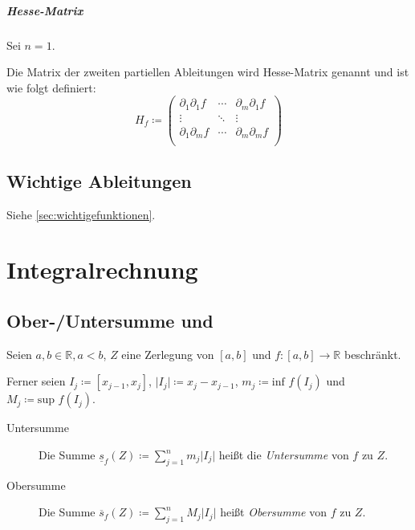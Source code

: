 	\paragraph{Hesse-Matrix}
		Sei $ n = 1 $.

		Die Matrix der zweiten partiellen Ableitungen wird Hesse-Matrix genannt und ist wie folgt definiert:
		\begin{equation*}
			H _ f \coloneqq
			\begin{pmatrix}
				\partial _ 1 \partial _ 1 f & \cdots & \partial _ m \partial _ 1 f \\
				\vdots                      & \ddots & \vdots                      \\
				\partial _ 1 \partial _ m f & \cdots & \partial _ m \partial _ m f \\
			\end{pmatrix}
		\end{equation*}

	\section{Wichtige Ableitungen}
		Siehe \ref{sec:wichtigefunktionen}.

	\chapter{Integralrechnung}
		\section{Ober-/Untersumme und}
			Seien $ a, b \in \mathbb{R}, a < b $, $ Z $ eine Zerlegung von $ [a, b] $ und $ f : [a, b] \rightarrow \mathbb{R} $ beschränkt.

			Ferner seien $ I _ j \coloneqq [x _ { j - 1 }, x _ j] $, $ \lvert I _ j \rvert \coloneqq x _ j - x _ { j - 1 } $, $ m _ j \coloneqq \text{inf } f(I _ j) $ und $ M _ j \coloneqq \text{sup } f(I _ j) $.

			\begin{description}
				\item[Untersumme] Die Summe $ \underline{s} _ f (Z) \coloneqq \sum _ { j = 1 } ^ n m _ j \lvert I _ j \rvert $ heißt die \textit{Untersumme} von $ f $ zu $ Z $.
				\item[Obersumme] Die Summe $ \overline{s} _ f (Z) \coloneqq \sum _ { j = 1 } ^ n M _ j \lvert I _ j \rvert $ heißt \textit{Obersumme} von $ f $ zu $ Z $.
			\end{description}

